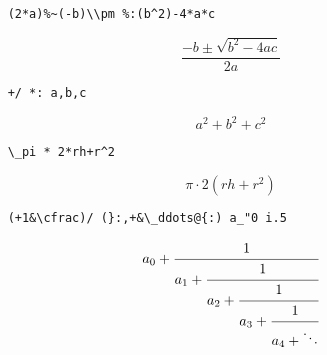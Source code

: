 \documentclass{article}
\begin{document}
\begin{lstlisting}
    (2*a)%~(-b)\\pm %:(b^2)-4*a*c
\end{lstlisting}
\[\frac{-b \pm \sqrt{b^2-4 a c}}{2 a}\]
\begin{lstlisting}
    +/ *: a,b,c
\end{lstlisting}
\[a^2+b^2+c^2\]
\begin{lstlisting}
    \_pi * 2*rh+r^2
\end{lstlisting}
\[\pi\cdot 2 (rh+r^2)\]
\begin{lstlisting}
    (+1&\cfrac)/ (}:,+&\_ddots@{:) a_"0 i.5
\end{lstlisting}
\[a_0+\cfrac{1}{a_1+\cfrac{1}{a_2+\cfrac{1}{a_3+\cfrac{1}{a_4+\ddots}}}}\]
\end{document}
